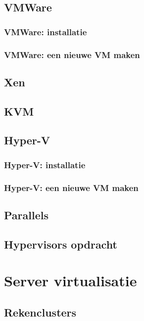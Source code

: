 \documentclass[a4paper,12pt,twoside,openright,titlepage]{book}
\begin{document}
\subsection{VMWare}

\subsubsection{VMWare: installatie}

\subsubsection{VMWare: een nieuwe VM maken}

\subsection{Xen}

\subsection{KVM}

\subsection{Hyper-V}

\subsubsection{Hyper-V: installatie}

\subsubsection{Hyper-V: een nieuwe VM maken}

\subsection{Parallels}

\subsection{Hypervisors opdracht}

\section{Server virtualisatie}

\subsection{Rekenclusters}

\end{document}
